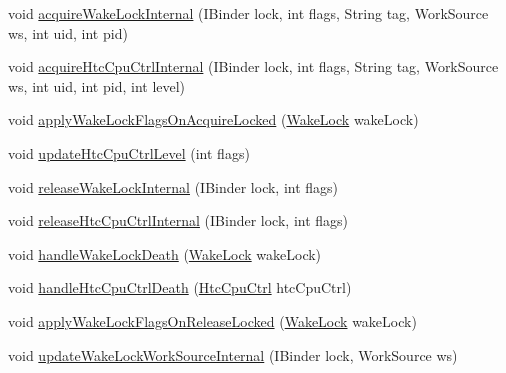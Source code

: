 \begin{DoxyCompactItemize}
\item 
void \hyperlink{classcom_1_1android_1_1server_1_1power_1_1PowerManagerService_a8062a7568b471234a9b21f700d9d1359}{acquire\-Wake\-Lock\-Internal} (I\-Binder lock, int flags, String tag, Work\-Source ws, int uid, int pid)
\item 
void \hyperlink{classcom_1_1android_1_1server_1_1power_1_1PowerManagerService_a322ee75df8e59595b7b35a8ee1a8d811}{acquire\-Htc\-Cpu\-Ctrl\-Internal} (I\-Binder lock, int flags, String tag, Work\-Source ws, int uid, int pid, int level)
\item 
void \hyperlink{classcom_1_1android_1_1server_1_1power_1_1PowerManagerService_a95099e0f6140722c01006bd184b74179}{apply\-Wake\-Lock\-Flags\-On\-Acquire\-Locked} (\hyperlink{classcom_1_1android_1_1server_1_1power_1_1PowerManagerService_1_1WakeLock}{Wake\-Lock} wake\-Lock)
\item 
void \hyperlink{classcom_1_1android_1_1server_1_1power_1_1PowerManagerService_afc424d995ac8ada9ce9d42ff4b0d543e}{update\-Htc\-Cpu\-Ctrl\-Level} (int flags)
\item 
void \hyperlink{classcom_1_1android_1_1server_1_1power_1_1PowerManagerService_a72f094a733821b0841fb87e6ce483e95}{release\-Wake\-Lock\-Internal} (I\-Binder lock, int flags)
\item 
void \hyperlink{classcom_1_1android_1_1server_1_1power_1_1PowerManagerService_a381e211c949f0174ee2e4e7b5657c36b}{release\-Htc\-Cpu\-Ctrl\-Internal} (I\-Binder lock, int flags)
\item 
void \hyperlink{classcom_1_1android_1_1server_1_1power_1_1PowerManagerService_a93770a6a702fa99b164d1218b35fcfec}{handle\-Wake\-Lock\-Death} (\hyperlink{classcom_1_1android_1_1server_1_1power_1_1PowerManagerService_1_1WakeLock}{Wake\-Lock} wake\-Lock)
\item 
void \hyperlink{classcom_1_1android_1_1server_1_1power_1_1PowerManagerService_af12cce8a20357a4f3eaa6370e3ba1315}{handle\-Htc\-Cpu\-Ctrl\-Death} (\hyperlink{classcom_1_1android_1_1server_1_1power_1_1PowerManagerService_1_1HtcCpuCtrl}{Htc\-Cpu\-Ctrl} htc\-Cpu\-Ctrl)
\item 
void \hyperlink{classcom_1_1android_1_1server_1_1power_1_1PowerManagerService_a6fd027d7c3d94f880afcde5f3fc67b0a}{apply\-Wake\-Lock\-Flags\-On\-Release\-Locked} (\hyperlink{classcom_1_1android_1_1server_1_1power_1_1PowerManagerService_1_1WakeLock}{Wake\-Lock} wake\-Lock)
\item 
void \hyperlink{classcom_1_1android_1_1server_1_1power_1_1PowerManagerService_af077f44df6024eccff085282c9cbc813}{update\-Wake\-Lock\-Work\-Source\-Internal} (I\-Binder lock, Work\-Source ws)

\end{DoxyCompactItemize}
